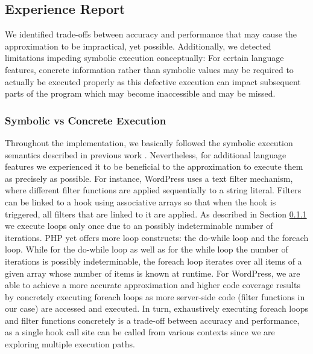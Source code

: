 \documentclass[sigconf]{acmart}
\renewcommand{\sf}[1]{\textsf{#1}}
\begin{document}
\subsection{Experience Report}
We identified trade-offs between accuracy and performance that may
cause the approximation to be impractical, yet possible. Additionally, we
detected limitations impeding symbolic execution conceptually: For certain
language features, concrete information rather than symbolic values may be required to
actually be executed properly as this defective execution can impact subsequent
parts of the program which may become inaccessible and may be missed.

\subsubsection{Symbolic vs Concrete Execution}
Throughout the implementation, we basically followed the symbolic execution
semantics described in previous work \cite{Nguyen:2014:BCG:2635868.2635928}.
Nevertheless, for additional language features we experienced it to be beneficial to the
approximation to execute them as precisely as possible.
For instance, \sf{WordPress} uses a text filter mechanism, where different
filter functions are applied sequentially to a string literal. Filters can
be linked to a hook using  associative arrays so that when the hook is
triggered, all filters that are linked to it are applied. As described in
Section \ref{} we execute loops only once due to an possibly
indeterminable number of iterations. PHP yet offers more loop constructs: the
do-while loop and the foreach loop. While for the do-while loop as well as for
the while loop the number of iterations is possibly indeterminable, the foreach
loop iterates over all items of a given array whose number of items is known at
runtime. For \sf{WordPress}, we are able to achieve a more accurate
approximation and higher code coverage results by concretely executing foreach
loops as more server-side code (filter functions in our case) are accessed and
executed. In turn, exhaustively executing foreach loops and filter functions
concretely is a trade-off between accuracy and performance, as a single hook
call site can be called from various contexts since we are exploring multiple
execution paths.
\end{document}
